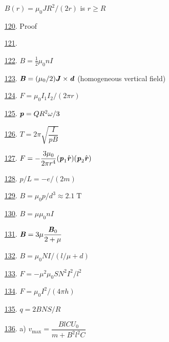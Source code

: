 \documentclass[11pt]{article}
\begin{document}
\begin{multicols}{2}
\begin{enumerate}
	$B(r)=\mu_0JR^2/(2r)$ is $r\geq R$ %
	\item [\hyperlink{P120}{120}.] Proof %
	\item [\hyperlink{P121}{121}.]  %
	\item [\hyperlink{P122}{122}.] $B=\frac{1}{2}\mu_0nI$ %
	\item [\hyperlink{P123}{123}.] $\textbf{\textit{B}}=(\mu_0/2)\textbf{\textit{J}}\times\textbf{\textit{d}}$ (homogeneous vertical field) %
	\item [\hyperlink{P124}{124}.] $F=\mu_0I_1I_2/(2\pi r)$ %
    \item [\hyperlink{P125}{125}.] $\textbf{\textit{p}}=QR^2\omega/3$ %
	\item [\hyperlink{P126}{126}.] $T=2\pi\sqrt{\dfrac{I}{pB}}$ %
	\item [\hyperlink{P127}{127}.] $F=-\dfrac{3\mu_0}{2\pi r^4}(\textbf{\textit{p}}_1\hat{\textbf{\textit{r}}})(\textbf{\textit{p}}_2\hat{\textbf{\textit{r}}})$ %
	\item [\hyperlink{P128}{128}.] $p/L=-e/(2m)$ %
	\item [\hyperlink{P129}{129}.] $B=\mu_0p/d^3\approx2.1\;\text{T}$ %
	\item [\hyperlink{P130}{130}.] $B=\mu\mu_0nI$ %
	\item [\hyperlink{P131}{131}.] $\textbf{\textit{B}}=3\mu\dfrac{\textbf{\textit{B}}_0}{2+\mu}$ %
	\item [\hyperlink{P132}{132}.] $B=\mu_0NI/(l/\mu+d)$ %
	\item [\hyperlink{P133}{133}.] $F=-\mu^2\mu_0SN^2I^2/l^2$ %
	\item [\hyperlink{P134}{134}.] $F=\mu_0I^2/(4\pi h)$ %
	\item [\hyperlink{P135}{135}.] $q=2BNS/R$ %
	\item [\hyperlink{P136}{136}.] a) $v_\text{max}=\dfrac{BlCU_0}{m+B^2l^2C}$
	

\end{enumerate}
\end{multicols}
\end{document}
